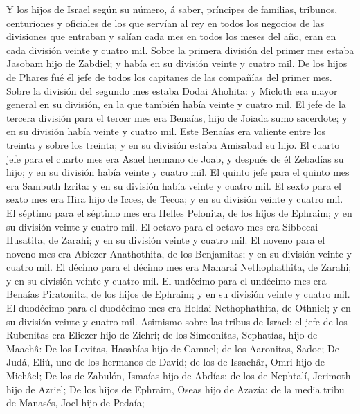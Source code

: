  Y los hijos de Israel según su número, á saber, príncipes
de familias, tribunos, centuriones y oficiales de los que servían al rey
en todos los negocios de las divisiones que entraban y salían cada mes
en todos los meses del año, eran en cada división veinte y cuatro mil.
 Sobre la primera división del primer mes estaba Jasobam
hijo de Zabdiel; y había en su división veinte y cuatro mil.
 De los hijos de Phares fué él jefe de todos los capitanes
de las compañías del primer mes.  Sobre la división del
segundo mes estaba Dodai Ahohita: y Micloth era mayor general en su
división, en la que también había veinte y cuatro mil.  El
jefe de la tercera división para el tercer mes era Benaías, hijo de
Joiada sumo sacerdote; y en su división había veinte y cuatro mil.
 Este Benaías era valiente entre los treinta y sobre los
treinta; y en su división estaba Amisabad su hijo.  El
cuarto jefe para el cuarto mes era Asael hermano de Joab, y después de
él Zebadías su hijo; y en su división había veinte y cuatro mil.
 El quinto jefe para el quinto mes era Sambuth Izrita: y
en su división había veinte y cuatro mil.  El sexto para
el sexto mes era Hira hijo de Icces, de Tecoa; y en su división veinte y
cuatro mil.  El séptimo para el séptimo mes era Helles
Pelonita, de los hijos de Ephraim; y en su división veinte y cuatro mil.
 El octavo para el octavo mes era Sibbecai Husatita, de
Zarahi; y en su división veinte y cuatro mil.  El noveno
para el noveno mes era Abiezer Anathothita, de los Benjamitas; y en su
división veinte y cuatro mil.  El décimo para el décimo
mes era Maharai Nethophathita, de Zarahi; y en su división veinte y
cuatro mil.  El undécimo para el undécimo mes era Benaías
Piratonita, de los hijos de Ephraim; y en su división veinte y cuatro
mil.  El duodécimo para el duodécimo mes era Heldai
Nethophathita, de Othniel; y en su división veinte y cuatro mil.
 Asimismo sobre las tribus de Israel: el jefe de los
Rubenitas era Eliezer hijo de Zichri; de los Simeonitas, Sephatías, hijo
de Maachâ:  De los Levitas, Hasabías hijo de Camuel; de
los Aaronitas, Sadoc;  De Judá, Eliú, uno de los hermanos
de David; de los de Issachâr, Omri hijo de Michâel;  De
los de Zabulón, Ismaías hijo de Abdías; de los de Nephtalí, Jerimoth
hijo de Azriel;  De los hijos de Ephraim, Oseas hijo de
Azazía; de la media tribu de Manasés, Joel hijo de Pedaía;

